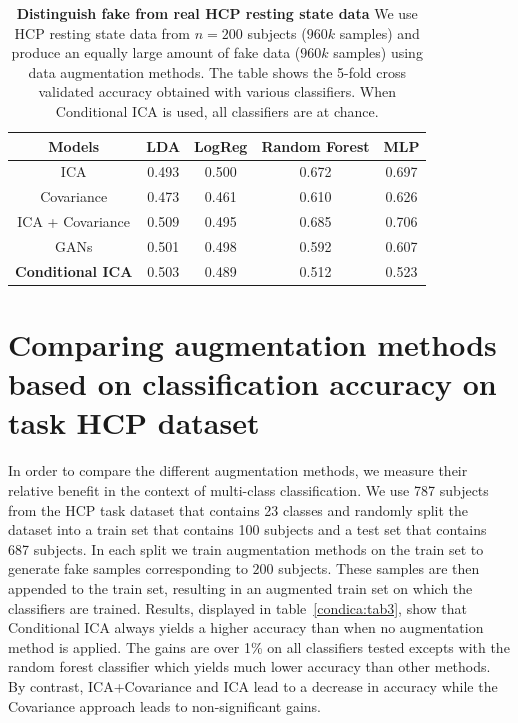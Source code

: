 \begin{table}
\begin{center}
\begin{tabular}{c|cccc}
\hline
Models & LDA  & LogReg & Random Forest &  MLP 
\\ \hline
ICA   & 0.493 & 0.500 & 0.672 &  0.697
\\
Covariance   & 0.473 & 0.461 & 0.610 &  0.626
\\
ICA + Covariance   & 0.509 & 0.495 & 0.685 &  0.706
\\
GANs   & 0.501 & 0.498 & 0.592 &  0.607
\\\hline
\textbf{Conditional ICA}  & 0.503 & 0.489 & 0.512 &  0.523
\\\hline\hline
\end{tabular}
\end{center}
  \caption{\textbf{Distinguish fake from real HCP resting state data}
    We use HCP resting state data from $n=200$ subjects ($960k$ samples) and produce an equally
    large amount of fake data ($960k$ samples) using data augmentation methods.
    The table shows the 5-fold cross validated accuracy obtained with various
    classifiers. When Conditional ICA is used, all classifiers are at chance.
    }\label{tab2}
\end{table}
%
\section{Comparing augmentation methods based on classification accuracy on task
  HCP dataset}
In order to compare the different augmentation methods, we measure their 
relative benefit in the context of multi-class classification.
We use 787 subjects from the HCP task dataset that contains 23 classes and
randomly split the dataset into a train set that contains 100 subjects and a test set
that contains 687 subjects. In each split we train augmentation methods on the
train set to generate fake samples corresponding to $200$ subjects.  
These samples are then appended to the train set, resulting in an
augmented train set on which the classifiers are trained. Results, displayed in
table~\ref{condica:tab3}, show that Conditional ICA always yields a higher accuracy
than when no augmentation method is applied. The gains are over 1\% on all
classifiers tested excepts with the random forest classifier which yields much
lower accuracy than other methods.
%
By contrast, ICA+Covariance and ICA lead to a decrease in accuracy
while the Covariance approach leads to non-significant
gains.
%

